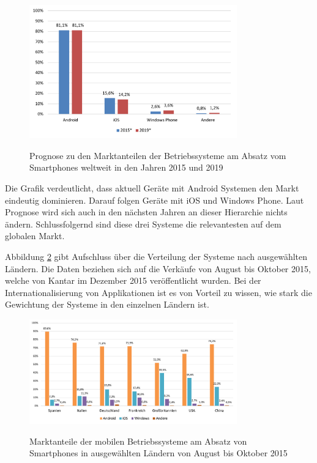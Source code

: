 \begin{figure}[htbp]
	\centering
	\includegraphics[width=0.8\textwidth]{Bilder/Marktanteile_Betriebssysteme}
	\caption{Prognose zu den Marktanteilen der Betriebssysteme am Absatz vom Smartphones weltweit in den Jahren 2015 und 2019}\label{graph_mobile_systems}\citep{marktanteile_betriebssysteme}
\end{figure}

Die Grafik verdeutlicht, dass aktuell Geräte mit Android Systemen den Markt eindeutig dominieren. Darauf folgen Geräte mit iOS und Windows Phone. Laut Prognose wird sich auch in den nächsten Jahren an dieser Hierarchie nichts ändern. Schlussfolgernd sind diese drei Systeme die relevantesten auf dem globalen Markt.

Abbildung \ref{graph_mobile_systems_laender} gibt Aufschluss über die Verteilung der Systeme nach ausgewählten Ländern. Die Daten beziehen sich auf die Verkäufe von August bis Oktober 2015, welche von Kantar im Dezember 2015 veröffentlicht wurden. Bei der Internationalisierung von Applikationen ist es von Vorteil zu wissen, wie stark die Gewichtung der Systeme in den einzelnen Ländern ist.

\begin{figure}[htbp]
	\centering
	\includegraphics[width=0.8\textwidth]{Bilder/Marktanteile_nach_Laendern}
	\caption{Marktanteile der mobilen Betriebssysteme am Absatz von Smartphones in ausgewählten Ländern von August bis Oktober 2015}\label{graph_mobile_systems_laender}\citep{marktanteile_betriebssysteme_laender}
\end{figure}

